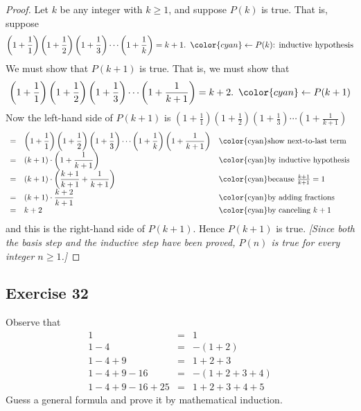 \documentclass[14pt]{extarticle}
\newcommand{\dps}{\displaystyle}
\newcommand{\from}{\leftarrow}
\newcommand{\cy}{\color{cyan}}
\begin{document}
\begin{proof}
    Let $k$ be any integer with $k \geq 1$, and suppose $P(k)$ is true. That is, suppose
    \[
        \dps \left(1 + \frac{1}{1}\right)\left(1 + \frac{1}{2}\right)\left(1 + \frac{1}{3}\right) \cdots \left(1 + \frac{1}{k}\right) = k+1. \,\,\, {\cy \from P(k) \text{: inductive hypothesis}}
    \]
    We must show that $P(k + 1)$ is true. That is, we must show that
    \[
        \dps \left(1 + \frac{1}{1}\right)\left(1 + \frac{1}{2}\right)\left(1 + \frac{1}{3}\right) \cdots \left(1 + \frac{1}{k+1}\right) = k+2. \,\,\,{\cy \from P(k+1)}
    \]
    Now the left-hand side of $P(k + 1)$ is $\left(1 + \frac{1}{1}\right)\left(1 + \frac{1}{2}\right)\left(1 + \frac{1}{3}\right) \cdots \left(1 + \frac{1}{k+1}\right)$
    \[
        \begin{array}{lll}
            = & \dps \left(1 + \frac{1}{1}\right)\left(1 + \frac{1}{2}\right)\left(1 + \frac{1}{3}\right) \cdots \left(1 + \frac{1}{k}\right) \left(1 + \frac{1}{k+1}\right) & \text{\cy show next-to-last term}        \\
            = & \dps (k+1) \cdot \left(1 + \frac{1}{k+1}\right)                                                                                                              & \text{\cy by inductive hypothesis}       \\
            = & \dps (k+1) \cdot \left(\frac{k+1}{k+1} + \frac{1}{k+1}\right)                                                                                                & \text{\cy because $\frac{k+1}{k+1} = 1$} \\
            = & \dps (k+1) \cdot \frac{k+2}{k+1}                                                                                                                             & \text{\cy by adding fractions}           \\
            = & k+2                                                                                                                                                          & \text{\cy by canceling $k+1$}
        \end{array}
    \]
    and this is the right-hand side of $P(k + 1)$. Hence $P(k + 1)$ is true. {\it [Since both the basis step and the inductive step have been proved, $P(n)$ is true for every integer $n \geq 1$.]}
\end{proof}

\subsection{Exercise 32}
Observe that
\[
    \begin{array}{rcl}
        1                   & = & 1          \\
        1 - 4               & = & -(1+2)     \\
        1 - 4 + 9           & = & 1+2+3      \\
        1 - 4 + 9 - 16      & = & -(1+2+3+4) \\
        1 - 4 + 9 - 16 + 25 & = & 1+2+3+4+5
    \end{array}
\]
Guess a general formula and prove it by mathematical induction.
\end{document}
